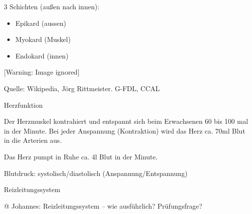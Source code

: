 \documentclass{article}
\makeatletter
\newcommand\captionof[1]{\def\@captype{#1}\caption}
\makeatother
\begin{document}
3 Schichten (au{\ss}en nach innen):

\begin{itemize}
\item Epikard (aussen)

\item Myokard (Muskel)

\item Endokard (innen)

\end{itemize}
\begin{minipage}{13.6cm}
 [Warning: Image ignored] %
\captionof{figure}[Schema der Herz-Anatomie. ]{Schema der Herz-Anatomie.
}
Quelle: Wikipedia,  J\"org Rittmeister. G-FDL, CCAL

\end{minipage}

Herzfunktion

Der Herzmuskel kontrahiert und entspannt sich beim Erwachsenen 60 bis
100 mal in der Minute. Bei jeder Anspannung (Kontraktion) wird das Herz
ca. 70ml Blut in die Arterien aus. 

Das Herz pumpt in Ruhe ca. 4l Blut in der Minute. 

Blutdruck: systolisch/diastolisch  (Anspannung/Entspannung)

%
%
Reizleitungssystem

@ Johannes: Reizleitungssystem -- wie ausf\"uhrlich? Pr\"ufungsfrage?
\end{document}
